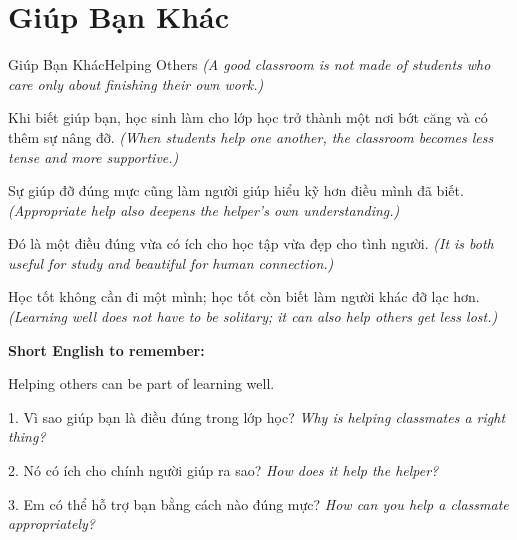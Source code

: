 \section{Giúp Bạn Khác}
\begin{truyen}{Giúp Bạn Khác}{Helping Others}
\textit{(A good classroom is not made of students who care only about finishing their own work.)}

Khi biết giúp bạn, học sinh làm cho lớp học trở thành một nơi bớt căng và có thêm sự nâng đỡ.
\textit{(When students help one another, the classroom becomes less tense and more supportive.)}

Sự giúp đỡ đúng mực cũng làm người giúp hiểu kỹ hơn điều mình đã biết.
\textit{(Appropriate help also deepens the helper's own understanding.)}

Đó là một điều đúng vừa có ích cho học tập vừa đẹp cho tình người.
\textit{(It is both useful for study and beautiful for human connection.)}
\end{truyen}

\begin{baihoc}
Học tốt không cần đi một mình; học tốt còn biết làm người khác đỡ lạc hơn.
\textit{(Learning well does not have to be solitary; it can also help others get less lost.)}
\end{baihoc}

\begin{ghinhoanh}
\textbf{Short English to remember:}

Helping others can be part of learning well.

\end{ghinhoanh}

\begin{tuhocnhanh}
1. Vì sao giúp bạn là điều đúng trong lớp học? \textit{Why is helping classmates a right thing?}

2. Nó có ích cho chính người giúp ra sao? \textit{How does it help the helper?}

3. Em có thể hỗ trợ bạn bằng cách nào đúng mực? \textit{How can you help a classmate appropriately?}
\end{tuhocnhanh}
\ngancach

